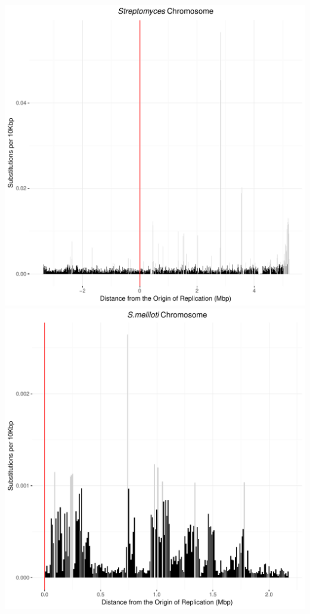 \documentclass[12pt]{article}
\begin{document}
\includegraphics[width=\textwidth]{strep_weighted_subs_bidirectionality_colour_8Nov19.pdf}
\includegraphics[width=\textwidth]{sinoC_weighted_subs_bidirectionality_colour_8Nov19.pdf}
\end{document}
